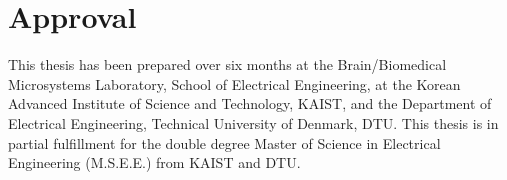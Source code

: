 \thispagestyle{main}

\chapter*{Approval}
This thesis has been prepared over six months at the Brain/Biomedical Microsystems Laboratory, School of Electrical Engineering, at the Korean Advanced Institute of Science and Technology, KAIST, and the Department of Electrical Engineering, Technical University of Denmark, DTU. This thesis is in partial fulfillment for the double degree Master of Science in Electrical Engineering (M.S.E.E.) from KAIST and DTU.

\vfill

\begin{center}
\namesigdate{\thesisauthor~-~\studentnumber}
\end{center}
\thispagestyle{empty}
\vfill

